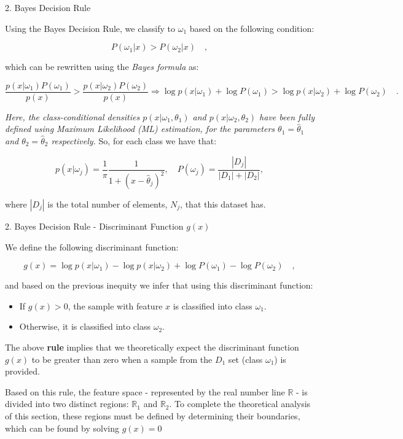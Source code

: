 \documentclass[aspectratio=169,xcolor=dvipsnames]{beamer}
\begin{document}
\begin{frame}{2. Bayes Decision Rule}

    Using the Bayes Decision Rule, we classify to $\omega_1$ based on the following condition:
    
    $$ P(\omega_1 | x) > P(\omega_2 | x) \quad, $$
    
    which can be rewritten using the \textit{Bayes formula} as:
    
    $$ \frac{p(x|\omega_1) P(\omega_1)}{p(x)} > \frac{p(x|\omega_2) P(\omega_2)}{p(x)} \Rightarrow \log p(x|\omega_1) + \log P(\omega_1) > \log p(x|\omega_2) + \log P(\omega_2) \quad. $$
    
    \textit{Here, the class-conditional densities $p(x|\omega_1, \theta_1)$ and $p(x|\omega_2, \theta_2)$ have been fully defined using Maximum Likelihood (ML) estimation, for the parameters $\theta_1 = \hat{\theta}_1$ and $\theta_2 = \hat{\theta}_2$ respectively.} So, for each class we have that:
    
    $$ p(x|\omega_j) = \frac{1}{\pi}\frac{1}{1 + (x - \hat{\theta}_j)^2}, \quad P(\omega_j) = \frac{|D_j|}{|D_1| + |D_2|}, $$
    
    where $|D_j|$ is the total number of elements, $N_j$, that this dataset has.
    
\end{frame}


\begin{frame}{2. Bayes Decision Rule - Discriminant Function $g(x)$}

    We define the following discriminant function:

    $$ g(x) = \log p(x|\omega_1) - \log p(x|\omega_2) + \log P(\omega_1) - \log P(\omega_2) \quad, $$
    
    and based on the previous inequity we infer that using this discriminant function:

    \begin{itemize}
        \item If $g(x) > 0$, the sample with feature $x$ is classified into class $\omega_1$.
        \item Otherwise, it is classified into class $\omega_2$.

    \end{itemize}
    
    The above \textbf{rule} implies that we theoretically expect the discriminant function $g(x)$ to be greater than zero when a sample from the $D_1$ set (class $\omega_1$) is provided. 

    \vspace{5pt}
    
    Based on this rule, the feature space - represented by the real number line $\mathbb{R}$ - is divided into two distinct regions: $\mathbb{R}_1$ and $\mathbb{R}_2$. To complete the theoretical analysis of this section, these regions must be defined by determining their boundaries, which can be found by solving $g(x) = 0$
    
\end{frame}
\end{document}
